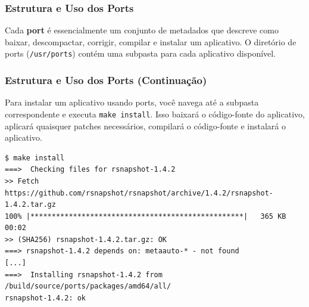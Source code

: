 \documentclass[9pt,xcolor=table]{beamer}
\begin{document}
\begin{frame}[fragile]
\frametitle{Estrutura e Uso dos Ports}
\justifying
Cada \textbf{port} é essencialmente um conjunto de metadados que descreve como baixar, descompactar, corrigir, compilar e instalar um aplicativo. O diretório de ports (\verb|/usr/ports|) contém uma subpasta para cada aplicativo disponível.
\vspace{0.5cm}
\end{frame}
\begin{frame}[fragile]
\frametitle{Estrutura e Uso dos Ports (Continuação)}
\justifying
Para instalar um aplicativo usando ports, você navega até a subpasta correspondente e executa \verb|make install|. Isso baixará o código-fonte do aplicativo, aplicará quaisquer patches necessários, compilará o código-fonte e instalará o aplicativo.
\vspace{0.5cm}
\begin{lstlisting}
$ make install
===>  Checking files for rsnapshot-1.4.2
>> Fetch https://github.com/rsnapshot/rsnapshot/archive/1.4.2/rsnapshot-1.4.2.tar.gz
100% |**************************************************|   365 KB    00:02
>> (SHA256) rsnapshot-1.4.2.tar.gz: OK
===> rsnapshot-1.4.2 depends on: metaauto-* - not found
[...]
===>  Installing rsnapshot-1.4.2 from /build/source/ports/packages/amd64/all/
rsnapshot-1.4.2: ok
\end{lstlisting}
\end{frame}
\end{document}
